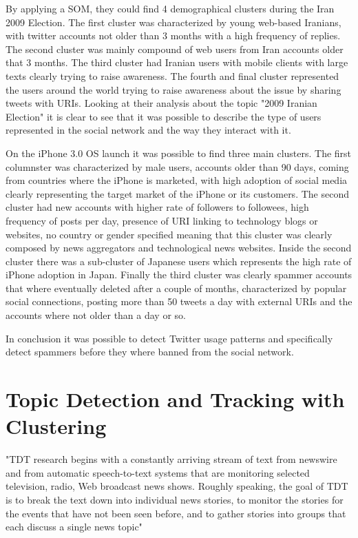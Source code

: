 By applying a \ac{SOM}, they could find 4 demographical clusters during the Iran 2009 Election. The first cluster was characterized by young web-based Iranians, with twitter accounts not older than 3 months with a high frequency of replies. The second cluster was mainly compound of web users from Iran accounts older that 3 months. The third cluster had Iranian users with mobile clients with large texts clearly trying to raise awareness. The fourth and final cluster represented the users around the world trying to raise awareness about the issue by sharing tweets with URIs.
Looking at their analysis about the topic "2009 Iranian Election" it is clear to see that it was possible to describe the type of users represented in the social network and the way they interact with it.

On the iPhone 3.0 OS launch it was possible to find three main clusters. The first columnster was characterized by male users, accounts older than 90 days, coming from countries where the iPhone is marketed, with high adoption of social media clearly representing the target market of the iPhone or its customers. The second cluster had new accounts with higher rate of followers to followees, high frequency of posts per day, presence of URI linking to technology blogs or websites, no country or gender specified meaning that this cluster was clearly composed by news aggregators and technological news websites. Inside the second cluster there was a sub-cluster of Japanese users which represents the high rate of iPhone adoption in Japan. Finally the third cluster was clearly spammer accounts that where eventually deleted after a couple of months, characterized by popular social connections, posting more than 50 tweets a day with external URIs and the accounts where not older than a day or so.

In conclusion it was possible to detect Twitter usage patterns and specifically detect spammers before they where banned from the social network. 

\section{Topic Detection and Tracking with Clustering} 
\label{sec:topic_detection_on_twitter}

"\ac{TDT} research begins with a constantly arriving stream of text from newswire and from automatic speech-to-text systems that are monitoring selected television, radio, Web broadcast news shows. Roughly speaking, the goal of \ac{TDT} is to break the text down into individual news stories, to monitor the stories for the events that have not been seen before, and to gather stories into groups that each discuss a single news topic"~\cite{allan2002topic}

